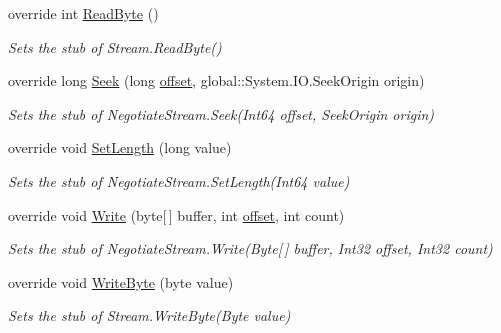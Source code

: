 \begin{DoxyCompactItemize}
override int \hyperlink{class_system_1_1_net_1_1_security_1_1_fakes_1_1_stub_negotiate_stream_a8c381226f2a706a28b9c8a5adfb709ad}{Read\-Byte} ()
\begin{DoxyCompactList}\small\item\em Sets the stub of Stream.\-Read\-Byte()\end{DoxyCompactList}\item 
override long \hyperlink{class_system_1_1_net_1_1_security_1_1_fakes_1_1_stub_negotiate_stream_a97ee9086e0f777ee943de3ab99c39a86}{Seek} (long \hyperlink{jquery-1_810_82_8js_a4a9f594d20d927164551fc7fa4751a2f}{offset}, global\-::\-System.\-I\-O.\-Seek\-Origin origin)
\begin{DoxyCompactList}\small\item\em Sets the stub of Negotiate\-Stream.\-Seek(\-Int64 offset, Seek\-Origin origin)\end{DoxyCompactList}\item 
override void \hyperlink{class_system_1_1_net_1_1_security_1_1_fakes_1_1_stub_negotiate_stream_a37e5a63c201df6177a67c2c70b69d175}{Set\-Length} (long value)
\begin{DoxyCompactList}\small\item\em Sets the stub of Negotiate\-Stream.\-Set\-Length(\-Int64 value)\end{DoxyCompactList}\item 
override void \hyperlink{class_system_1_1_net_1_1_security_1_1_fakes_1_1_stub_negotiate_stream_af27c4a071012eab0aa09de5bdeb7a0fa}{Write} (byte\mbox{[}$\,$\mbox{]} buffer, int \hyperlink{jquery-1_810_82_8js_a4a9f594d20d927164551fc7fa4751a2f}{offset}, int count)
\begin{DoxyCompactList}\small\item\em Sets the stub of Negotiate\-Stream.\-Write(\-Byte\mbox{[}$\,$\mbox{]} buffer, Int32 offset, Int32 count)\end{DoxyCompactList}\item 
override void \hyperlink{class_system_1_1_net_1_1_security_1_1_fakes_1_1_stub_negotiate_stream_a4776df0e95f88963849f0b37d915d9a3}{Write\-Byte} (byte value)
\begin{DoxyCompactList}\small\item\em Sets the stub of Stream.\-Write\-Byte(\-Byte value)\end{DoxyCompactList}\end{DoxyCompactItemize}

